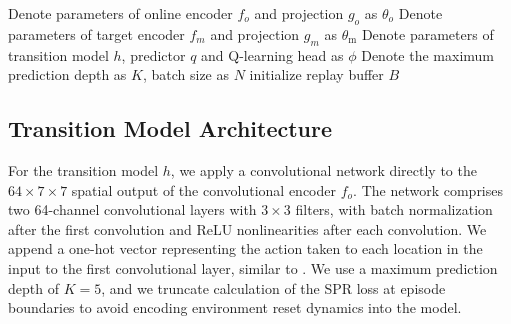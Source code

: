 \begin{algorithm}[ht]
\DontPrintSemicolon
{}
\SetAlgoLined
 Denote parameters of online encoder $f_o$ and projection $g_o$ as $\theta_o$\;
 Denote parameters of target encoder $f_m$ and projection $g_m$ as $\theta_\text{m}$\;
 Denote parameters of transition model $h$, predictor $q$ and Q-learning head as $\phi$\;
 Denote the maximum prediction depth as $K$, batch size as $N$\;
 initialize replay buffer $B$\;
 \caption{Self-Predictive Representations}
\end{algorithm}

\subsection{Transition Model Architecture}
\label{sec:transition_model}
For the transition model $h$, we apply a convolutional network directly to the $64\times7\times7$ spatial output of the convolutional encoder $f_o$. The network comprises two 64-channel convolutional layers with $3\times3$ filters, with batch normalization \citep{ioffe2015batch} after the first convolution and ReLU nonlinearities after each convolution.  We append a one-hot vector representing the action taken to each location in the input to the first convolutional layer, similar to \citet{muzero}.  We use a maximum prediction depth of $K=5$, and we truncate calculation of the SPR loss at episode boundaries to avoid encoding environment reset dynamics into the model.

